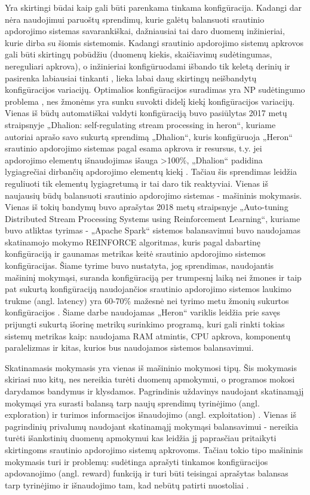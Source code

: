\documentclass{VUMIFPSbakalaurinis}
\begin{document}
Yra skirtingi būdai kaip gali būti parenkama tinkama konfigūracija. Kadangi dar nėra naudojimui paruoštų sprendimų, kurie galėtų balansuoti srautinio apdorojimo sistemas savarankiškai, dažniausiai tai daro duomenų inžinieriai, kurie dirba su šiomis sistemomis. Kadangi srautinio apdorojimo sistemų apkrovos gali būti skirtingų pobūdžiu (duomenų kiekis, skaičiavimų sudėtingumas, nereguliari apkrova), o inžinieriai konfigūruodami išbando tik keletą derinių ir pasirenka labiausiai tinkanti \cite{selfRegulatingStreaming}, lieka labai daug skirtingų neišbandytų konfigūracijos variacijų. Optimalios konfigūracijos suradimas yra NP sudėtingumo problema \cite{automateTuning}, nes žmonėms yra sunku suvokti didelį kiekį konfigūracijos variacijų. 
Vienas iš būdų automatiškai valdyti konfigūraciją buvo pasiūlytas 2017 metų straipsnyje „Dhalion: self-regulating stream processing in heron“, kuriame autoriai aprašo savo sukurtą sprendimą „Dhalion“, kuris konfigūruoja „Heron“ srautinio apdorojimo sistemas pagal esama apkrova ir resursus, t.y. jei apdorojimo elementų išnaudojimas išauga >100\%, „Dhalion“ padidina lygiagrečiai dirbančių apdorojimo elementų kiekį \cite{dhalion}. Tačiau šis sprendimas leidžia reguliuoti tik elementų lygiagretumą ir tai daro tik reaktyviai.
Vienas iš naujausių būdų balansuoti srautinio apdorojimo sistemas - mašininis mokymasis. Vienas iš tokių bandymų buvo aprašytas 2018 metų straipsnyje „Auto-tuning Distributed Stream Processing Systems using Reinforcement Learning“, kuriame buvo atliktas tyrimas - „Apache Spark“ sistemos balansavimui buvo naudojamas skatinamojo mokymo REINFORCE algoritmas, kuris pagal dabartinę konfigūraciją ir gaunamas metrikas keitė srautinio apdorojimo sistemos konfigūracijas. Šiame tyrime buvo nustatyta, jog sprendimas, naudojantis mašininį mokymąsi, suranda konfigūraciją per trumpesnį laiką nei žmones ir taip pat sukurtą konfigūraciją naudojančios srautinio apdorojimo sistemos laukimo trukme (angl. latency) yra 60-70\% mažesnė nei tyrimo metu žmonių sukurtos konfigūracijos \cite{vaquero2018autotuning}. Šiame darbe naudojamas „Heron“ variklis leidžia prie savęs prijungti sukurtą išorinę metrikų surinkimo programą, kuri gali rinkti tokias sistemų metrikas kaip: naudojama RAM atmintis, CPU apkrova, komponentų paralelizmas ir kitas, kurios bus naudojamos sistemos balansavimui. 

Skatinamasis mokymasis yra vienas iš mašininio mokymosi tipų. Šis mokymasis skiriasi nuo kitų, nes nereikia turėti duomenų apmokymui, o programos mokosi darydamos bandymus ir klysdamos. Pagrindinis uždavinys naudojant skatinamąjį mokymąsi yra surasti balansą tarp naujų sprendimų tyrinėjimo (angl. exploration) ir turimos informacijos išnaudojimo (angl. exploitation) \cite{reinforcment}. Vienas iš pagrindinių privalumų naudojant skatinamąjį mokymąsi balansavimui - nereikia turėti išankstinių duomenų apmokymui kas leidžia jį paprasčiau pritaikyti skirtingoms srautinio apdorojimo sistemų apkrovoms. Tačiau tokio tipo mašininis mokymasis turi ir problemų: sudėtinga aprašyti tinkamos konfigūracijos apdovanojimo (angl. reward) funkciją ir turi būti teisingai aprašytas balansas tarp tyrinėjimo ir išnaudojimo tam, kad nebūtų patirti nuostoliai \cite{selfRegulatingStreaming}.
\end{document}
